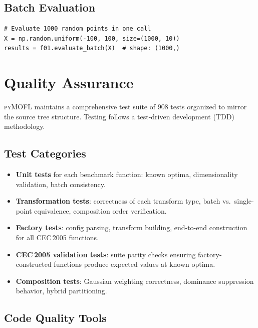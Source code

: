 \documentclass[11pt,a4paper]{article}
\newcommand{\pymofl}{\textsc{pyMOFL}}
\begin{document}
\subsection{Batch Evaluation}

\begin{lstlisting}[caption={Vectorized batch evaluation for population-based algorithms.}]
# Evaluate 1000 random points in one call
X = np.random.uniform(-100, 100, size=(1000, 10))
results = f01.evaluate_batch(X)  # shape: (1000,)
\end{lstlisting}

\section{Quality Assurance}\label{sec:quality}

\pymofl{} maintains a comprehensive test suite of 908 tests organized to mirror
the source tree structure. Testing follows a test-driven development (TDD)
methodology.

\subsection{Test Categories}

\begin{itemize}[nosep]
  \item \textbf{Unit tests} for each benchmark function: known optima,
    dimensionality validation, batch consistency.
  \item \textbf{Transformation tests}: correctness of each transform type,
    batch vs.\ single-point equivalence, composition order verification.
  \item \textbf{Factory tests}: config parsing, transform building, end-to-end
    construction for all CEC\,2005 functions.
  \item \textbf{CEC\,2005 validation tests}: suite parity checks ensuring
    factory-constructed functions produce expected values at known optima.
  \item \textbf{Composition tests}: Gaussian weighting correctness, dominance
    suppression behavior, hybrid partitioning.
\end{itemize}

\subsection{Code Quality Tools}
\end{document}
